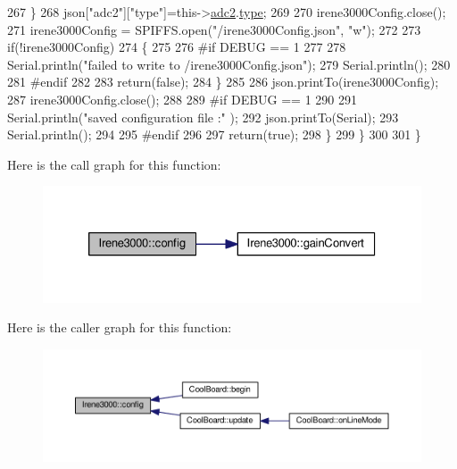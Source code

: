 \begin{DoxyCode}
267             \}
268             json[\textcolor{stringliteral}{"adc2"}][\textcolor{stringliteral}{"type"}]=this->\hyperlink{classIrene3000_aae3a95a1c83c766cd2f299ce471c337e}{adc2}.\hyperlink{structIrene3000_1_1state_a9897a7e02727db6351d44006eec73799}{type};
269 
270             irene3000Config.close();
271             irene3000Config = SPIFFS.open(\textcolor{stringliteral}{"/irene3000Config.json"}, \textcolor{stringliteral}{"w"});
272 
273             \textcolor{keywordflow}{if}(!irene3000Config)
274             \{
275             
276 \textcolor{preprocessor}{            #if DEBUG == 1}
277 
278                 Serial.println(\textcolor{stringliteral}{"failed to write to /irene3000Config.json"});
279                 Serial.println();
280             
281 \textcolor{preprocessor}{            #endif }
282 
283                 \textcolor{keywordflow}{return}(\textcolor{keyword}{false});
284             \}
285 
286             json.printTo(irene3000Config);
287             irene3000Config.close();
288             
289 \textcolor{preprocessor}{        #if DEBUG == 1 }
290 
291             Serial.println(\textcolor{stringliteral}{"saved configuration file :"} );
292             json.printTo(Serial);
293             Serial.println();
294         
295 \textcolor{preprocessor}{        #endif}
296 
297             \textcolor{keywordflow}{return}(\textcolor{keyword}{true}); 
298         \}
299     \}   
300 
301 \}
\end{DoxyCode}
Here is the call graph for this function\+:\nopagebreak
\begin{figure}[H]
\begin{center}
\leavevmode
\includegraphics[width=326pt]{classIrene3000_afed5c35e4b23963c157847ef27c11e9c_cgraph}
\end{center}
\end{figure}
Here is the caller graph for this function\+:\nopagebreak
\begin{figure}[H]
\begin{center}
\leavevmode
\includegraphics[width=350pt]{classIrene3000_afed5c35e4b23963c157847ef27c11e9c_icgraph}
\end{center}
\end{figure}
\mbox{\label{classIrene3000_abcad62d1201a59f8dd3ba87048002728}} 
